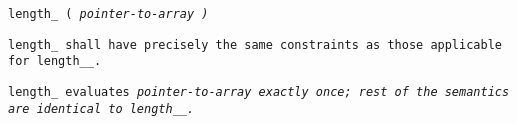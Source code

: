 
\tt{length_ (} \it{pointer-to-array} \tt{)}


\tt{length_} shall have precisely the same
constraints as those applicable for \tt{length__}.


\tt{length_} evaluates \it{pointer-to-array} exactly once;
rest of the semantics are identical to \tt{length__}.
